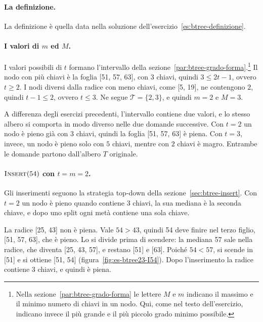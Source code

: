 \paragraph{La definizione.}
La definizione è quella data nella soluzione dell'esercizio~\ref{es:btree-definizione}.

\paragraph{I valori di $m$ ed $M$.}
I valori possibili di $t$ formano l'intervallo della sezione~\ref{par:btree-grado-forma}.\footnote{Nella sezione~\ref{par:btree-grado-forma} le lettere $M$ e $m$ indicano il massimo e il minimo numero di chiavi in un nodo. Qui, come nel testo dell'esercizio, indicano invece il più grande e il più piccolo grado minimo possibile.} Il nodo con più chiavi è la foglia [51, 57, 63], con $3$ chiavi, quindi $3 \le 2t-1$, ovvero $t \ge 2$. I nodi diversi dalla radice con meno chiavi, come [5, 19], ne contengono $2$, quindi $t-1 \le 2$, ovvero $t \le 3$. Ne segue $\mathcal{T} = \{2, 3\}$, e quindi $m = 2$ e $M = 3$.

A differenza degli esercizi precedenti, l'intervallo contiene due valori, e lo stesso albero si comporta in modo diverso nelle due domande successive. Con $t = 2$ un nodo è pieno già con $3$ chiavi, quindi la foglia [51, 57, 63] è piena. Con $t = 3$, invece, un nodo è pieno solo con $5$ chiavi, mentre con $2$ chiavi è magro. Entrambe le domande partono dall'albero $T$ originale.

\paragraph{$\textsc{Insert}(54)$ con $t = m = 2$.}
Gli inserimenti seguono la strategia top-down della sezione~\ref{sec:btree-insert}. Con $t = 2$ un nodo è pieno quando contiene $3$ chiavi, la sua mediana è la seconda chiave, e dopo uno split ogni metà contiene una sola chiave.

La radice [25, 43] non è piena. Vale $54 > 43$, quindi 54 deve finire nel terzo figlio, [51, 57, 63], che è pieno. Lo si divide prima di scendere: la mediana 57 sale nella radice, che diventa [25, 43, 57], e restano [51] e [63]. Poiché $54 < 57$, si scende in [51] e si ottiene [51, 54] (figura~\ref{fig:es-btree23-I54}). Dopo l'inserimento la radice contiene $3$ chiavi, e quindi è piena.

